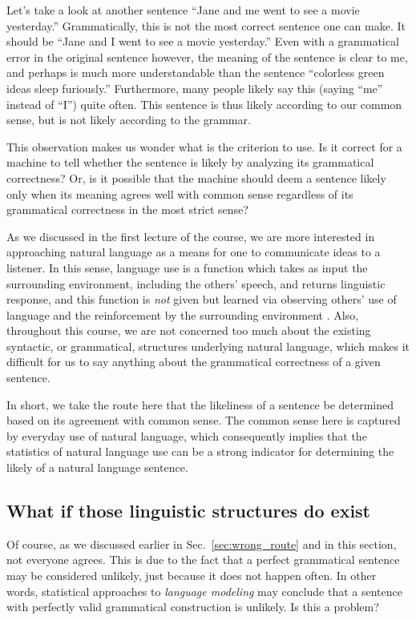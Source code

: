 \documentclass{report}
\begin{document}
Let's take a look at another sentence ``Jane and me went to see a movie
yesterday.'' Grammatically, this is not the most correct sentence one can make.
It should be ``Jane and I went to see a movie yesterday.'' Even with a
grammatical error in the original sentence however, the meaning of the sentence
is clear to me, and perhaps is much more understandable than the sentence
``colorless green ideas sleep furiously.'' Furthermore, many people likely say
this (saying ``me'' instead of ``I'') quite often. This sentence is thus likely
according to our common sense, but is not likely according to the grammar.

This observation makes us wonder what is the criterion to use. Is it correct for
a machine to tell whether the sentence is likely by analyzing its grammatical
correctness? Or, is it possible that the machine should deem a sentence likely
only when its meaning agrees well with common sense regardless of its
grammatical correctness in the most strict sense?

As we discussed in the first lecture of the course, we are more interested in
approaching natural language as a means for one to communicate ideas to a
listener. In this sense, language use is a function which takes as input the
surrounding environment, including the others' speech, and returns linguistic
response, and this function is {\em not} given but learned via observing others'
use of language and the reinforcement by the surrounding
environment \citep{skinner2014verbal}. Also, throughout this course, we are not
concerned too much about the existing syntactic, or grammatical, structures
underlying natural language, which makes it difficult for us to say anything
about the grammatical correctness of a given sentence.

In short, we take the route here that the likeliness of a sentence be determined
based on its agreement with common sense. The common sense here is captured by
everyday use of natural language, which consequently implies that the statistics
of natural language use can be a strong indicator for determining the likely of
a natural language sentence. 

\subsection{What if those linguistic structures do exist}
\label{sec:linguistic_lm}

Of course, as we discussed earlier in Sec.~\ref{sec:wrong_route} and in this
section, not everyone agrees.  This is due to the fact that a perfect
grammatical sentence may be considered unlikely, just because it does not happen
often. In other words, statistical approaches to {\em language modeling} may
conclude that a sentence with perfectly valid grammatical construction is
unlikely. Is this a problem? 
\end{document}
